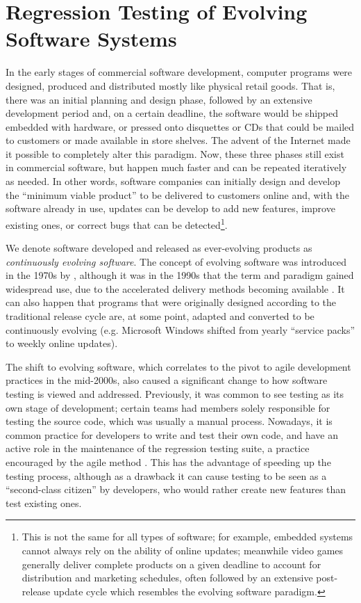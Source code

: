 \section{Regression Testing of Evolving Software Systems}
\label{sec:regression}

In the early stages of commercial software development, computer programs were designed, produced and distributed mostly like physical retail goods.
That is, there was an initial planning and design phase, followed by an extensive development period and, on a certain deadline, the software would be shipped embedded with hardware, or pressed onto disquettes or CDs that could be mailed to customers or made available in store shelves.
The advent of the Internet made it possible to completely alter this paradigm.
Now, these three phases still exist in commercial software, but happen much faster and can be repeated iteratively as needed.
In other words, software companies can initially design and develop the ``minimum viable product'' to be delivered to customers online and, with the software already in use, updates can be develop to add new features, improve existing ones, or correct bugs that can be detected\footnote{This is not the same for all types of software; for example, embedded systems cannot always rely on the ability of online updates; meanwhile video games generally deliver complete products on a given deadline to account for distribution and marketing schedules, often followed by an extensive post-release update cycle which resembles the evolving software paradigm.}.
 
We denote software developed and released as ever-evolving products as \textit{continuously evolving software}.
The concept of evolving software was introduced in the 1970s by \citet{Lehman1980}, although it was in the 1990s that the term and paradigm gained widespread use, due to the accelerated delivery methods becoming available \cite{Mens2008}.
It can also happen that programs that were originally designed according to the traditional release cycle are, at some point, adapted and converted to be continuously evolving (e.g. Microsoft Windows shifted from yearly ``service packs'' to weekly online updates).

The shift to evolving software, which correlates to the pivot to agile development practices in the mid-2000s, also caused a significant change to how software testing is viewed and addressed.
Previously, it was common to see testing as its own stage of development; certain teams had members solely responsible for testing the source code, which was usually a manual process.
Nowadays, it is common practice for developers to write and test their own code, and have an active role in the maintenance of the regression testing suite, a practice encouraged by the agile method \cite{planview_agile_testing}.
This has the advantage of speeding up the testing process, although as a drawback it can cause testing to be seen as a ``second-class citizen'' by developers, who would rather create new features than test existing ones.

